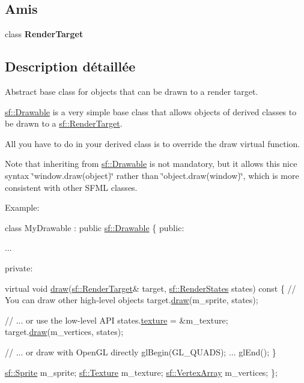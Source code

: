 \subsection*{Amis}
\begin{DoxyCompactItemize}
\item 
\mbox{\label{classsf_1_1Drawable_aa5afc6f82b7b587ed5ada4d227ce32aa}} 
class {\bfseries Render\+Target}
\end{DoxyCompactItemize}


\subsection{Description détaillée}
Abstract base class for objects that can be drawn to a render target. 

\hyperlink{classsf_1_1Drawable}{sf\+::\+Drawable} is a very simple base class that allows objects of derived classes to be drawn to a \hyperlink{classsf_1_1RenderTarget}{sf\+::\+Render\+Target}.

All you have to do in your derived class is to override the draw virtual function.

Note that inheriting from \hyperlink{classsf_1_1Drawable}{sf\+::\+Drawable} is not mandatory, but it allows this nice syntax \char`\"{}window.\+draw(object)\char`\"{} rather than \char`\"{}object.\+draw(window)\char`\"{}, which is more consistent with other S\+F\+ML classes.

Example\+: 
\begin{DoxyCode}
\textcolor{keyword}{class }MyDrawable : \textcolor{keyword}{public} \hyperlink{classsf_1_1Drawable}{sf::Drawable}
\{
\textcolor{keyword}{public}:

   ...

private:

    \textcolor{keyword}{virtual} \textcolor{keywordtype}{void} \hyperlink{classsf_1_1Drawable_a90d2c88bba9b035a0844eccb380ef631}{draw}(\hyperlink{classsf_1_1RenderTarget}{sf::RenderTarget}& target, 
      \hyperlink{classsf_1_1RenderStates}{sf::RenderStates} states)\textcolor{keyword}{ const}
\textcolor{keyword}{    }\{
        \textcolor{comment}{// You can draw other high-level objects}
        target.\hyperlink{classsf_1_1RenderTarget_a12417a3bcc245c41d957b29583556f39}{draw}(m\_sprite, states);

        \textcolor{comment}{// ... or use the low-level API}
        states.\hyperlink{classsf_1_1RenderStates_a457fc5a41731889de9cf39cf9b3436c3}{texture} = &m\_texture;
        target.\hyperlink{classsf_1_1RenderTarget_a12417a3bcc245c41d957b29583556f39}{draw}(m\_vertices, states);

        \textcolor{comment}{// ... or draw with OpenGL directly}
        glBegin(GL\_QUADS);
        ...
        glEnd();
    \}

    \hyperlink{classsf_1_1Sprite}{sf::Sprite} m\_sprite;
    \hyperlink{classsf_1_1Texture}{sf::Texture} m\_texture;
    \hyperlink{classsf_1_1VertexArray}{sf::VertexArray} m\_vertices;
\};
\end{DoxyCode}



